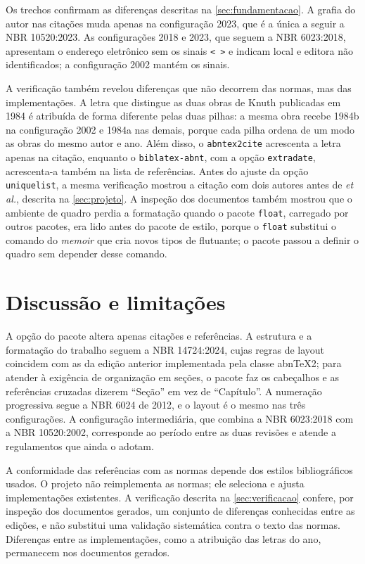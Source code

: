 \documentclass[
	article,
	12pt,
	oneside,
	a4paper,
	english,
	brazil,
]{abntex2}
\begin{document}
Os trechos confirmam as diferenças descritas na \autoref{sec:fundamentacao}. A grafia do autor nas citações muda apenas na configuração 2023, que é a única a seguir a NBR 10520:2023. As configurações 2018 e 2023, que seguem a NBR 6023:2018, apresentam o endereço eletrônico sem os sinais \texttt{< >} e indicam local e editora não identificados; a configuração 2002 mantém os sinais.

A verificação também revelou diferenças que não decorrem das normas, mas das implementações. A letra que distingue as duas obras de Knuth publicadas em 1984 é atribuída de forma diferente pelas duas pilhas: a mesma obra recebe 1984b na configuração 2002 e 1984a nas demais, porque cada pilha ordena de um modo as obras do mesmo autor e ano. Além disso, o \texttt{abntex2cite} acrescenta a letra apenas na citação, enquanto o \texttt{biblatex-abnt}, com a opção \texttt{extradate}, acrescenta-a também na lista de referências. Antes do ajuste da opção \texttt{uniquelist}, a mesma verificação mostrou a citação com dois autores antes de \textit{et al.}, descrita na \autoref{sec:projeto}. A inspeção dos documentos também mostrou que o ambiente de quadro perdia a formatação quando o pacote \texttt{float}, carregado por outros pacotes, era lido antes do pacote de estilo, porque o \texttt{float} substitui o comando do \textit{memoir} que cria novos tipos de flutuante; o pacote passou a definir o quadro sem depender desse comando.

\section{Discussão e limitações}\label{sec:discussao}

A opção do pacote altera apenas citações e referências. A estrutura e a formatação do trabalho seguem a NBR 14724:2024, cujas regras de layout coincidem com as da edição anterior implementada pela classe abn\TeX2; para atender à exigência de organização em seções, o pacote faz os cabeçalhos e as referências cruzadas dizerem ``Seção'' em vez de ``Capítulo''. A numeração progressiva segue a NBR 6024 de 2012, e o layout é o mesmo nas três configurações. A configuração intermediária, que combina a NBR 6023:2018 com a NBR 10520:2002, corresponde ao período entre as duas revisões e atende a regulamentos que ainda o adotam.

A conformidade das referências com as normas depende dos estilos bibliográficos usados. O projeto não reimplementa as normas; ele seleciona e ajusta implementações existentes. A verificação descrita na \autoref{sec:verificacao} confere, por inspeção dos documentos gerados, um conjunto de diferenças conhecidas entre as edições, e não substitui uma validação sistemática contra o texto das normas. Diferenças entre as implementações, como a atribuição das letras do ano, permanecem nos documentos gerados.
\end{document}
